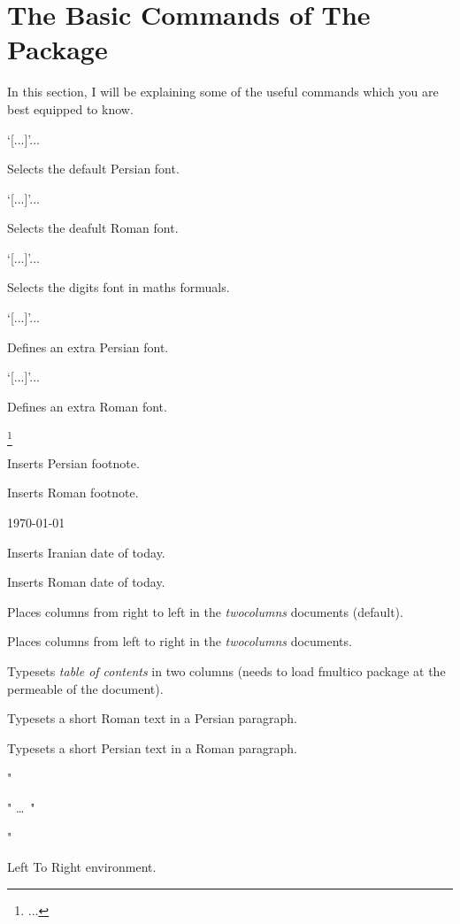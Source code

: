 \section{The Basic Commands of The Package\label{s-1}}
In this section, I will be explaining some of the useful commands which you are best equipped to know.
\begin{description}
\mitem \settextfont`[...]'{...}

Selects the default Persian font.

\mitem \setromantextfont`[...]'{...}

Selects the deafult Roman font.

\mitem \setdigitfont`[...]'{...}

Selects the digits font in maths formuals.

\mitem {}\n\fontname`[...]'{...}

Defines an extra Persian font.

\mitem {}\n\fontname`[...]'{...}

Defines an extra Roman font.

\mitem \footnote{...}

Inserts Persian footnote.

\mitem {}

Inserts Roman footnote.

\mitem \today

Inserts Iranian date of today.

\mitem \romantoday

Inserts Roman date of today.

\mitem \rldblcolumn

Places columns from right to left in the \emph{twocolumns} documents (default).

\mitem \lrdblcolumn

Places columns from left to right in the \emph{twocolumns} documents.

\mitem \twocolumnstableofcontents

Typesets \emph{table of contents} in two columns (needs to load \textsf{fmultico} package at the permeable of the document).

\mitem {} 

Typesets a short Roman text in a Persian paragraph.

\mitem {}

Typesets a short Persian text in a Roman paragraph.
\end{description}
\begin{Ex}
  "\begin{LTR}" \ldots\ "\end{LTR}"
\end{Ex}
Left To Right environment.

